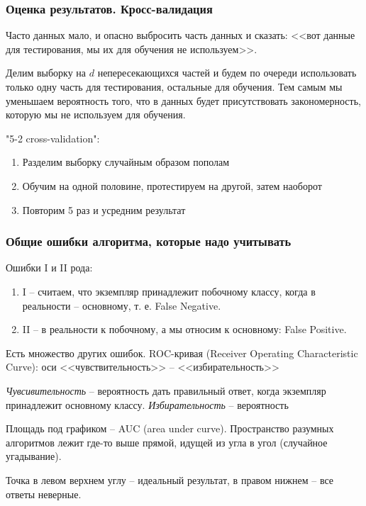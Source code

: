 \documentclass[main.tex]{subfiles}
\begin{document}
\subsubsection{Оценка результатов. Кросс-валидация}

Часто данных мало, и опасно выбросить часть данных и сказать: <<вот данные для тестирования, мы их для обучения не используем>>.

Делим выборку на $d$ непересекающихся частей и будем по очереди использовать только одну часть для тестирования, остальные для обучения.
Тем самым мы уменьшаем вероятность того, что в данных будет присутствовать закономерность, которую мы не используем для обучения.

"5-2 cross-validation":

\begin{enumerate}[noitemsep]
	\item Разделим выборку случайным образом пополам
	\item Обучим на одной половине, протестируем на другой, затем наоборот
	\item Повторим 5 раз и усредним результат
\end{enumerate}

\subsubsection{Общие ошибки алгоритма, которые надо учитывать}

Ошибки I и II рода:

\begin{enumerate}[noitemsep]
	\item I -- считаем, что экземпляр принадлежит побочному классу, когда в реальности -- основному, т. е. False Negative.
	\item II -- в реальности к побочному, а мы относим к основному: False Positive.
\end{enumerate}

Есть множество других ошибок.
ROC-кривая (Receiver Operating Characteristic Curve): оси <<чувствительность>> -- <<избирательность>>

\emph{Чувсивительность} -- вероятность дать правильный ответ, когда экземпляр принадлежит основному классу.
\emph{Избирательность} -- вероятность

Площадь под графиком -- AUC (area under curve).
Пространство разумных алгоритмов лежит где-то выше прямой, идущей из угла в угол (случайное угадывание).

Точка в левом верхнем углу -- идеальный результат, в правом нижнем -- все ответы неверные.
\end{document}
